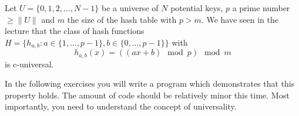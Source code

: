 Let $U = \lbrace 0,1,2,\dots,N-1 \rbrace$ be a universe of $N$
potential keys, $p$ a prime number $\geq \|U\|$ and $m$ the size of the hash table with $p > m$.
We have seen in the lecture that the class of hash functions
\begin{math}
  H = \lbrace h_{a,b}: a \in \lbrace 1, \dots, p-1 \rbrace,
    b \in \lbrace 0, \dots, p-1 \rbrace\rbrace
\end{math}
with 
\begin{equation}
  h_{a,b}(x) = ((ax + b) \mod p) \mod m
\end{equation}
is c-universal.

In the following exercises you will write a program which demonstrates that
this property holds. The amount of code should be relatively minor this time.
Most importantly, you need to understand the concept of universality.

